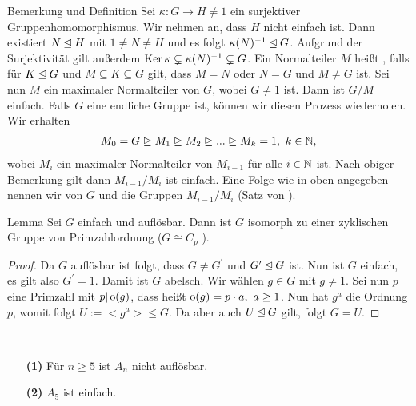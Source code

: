 \begin{genericdf}{Bemerkung und Definition} \label{skript:4.8}    
	Sei $ \kappa : G \to H \neq 1 $ ein surjektiver Gruppenhomomorphismus.
	Wir nehmen an, dass $ H $ nicht einfach ist. Dann existiert $ N \unlhd H $ mit $ 1 \neq N \neq H $ und es folgt
	$ \kappa(N)^{-1} \unlhd G $. Aufgrund der Surjektivität gilt außerdem $ \operatorname{Ker} \kappa \subsetneq \kappa(N)^{-1} \subsetneq G $. 
	Ein Normalteiler $ M $ heißt , falls für $ K \unlhd G $ und $ M \subseteq K \subseteq G $ gilt,
	dass $ M=N   $ oder $ N=G $ und $ M \neq G $ ist.
	Sei nun $ M $ ein maximaler Normalteiler von $ G $, wobei $ G \neq 1 $ ist. Dann ist $ G/M $ einfach.
	Falls $ G $ eine endliche Gruppe ist, können wir diesen Prozess wiederholen. Wir erhalten
	\begin{align*}
	M_0 = G \trianglerighteq M_1 \trianglerighteq M_2 \trianglerighteq ...\trianglerighteq M_k = 1, \ k \in \mathbb{N} ,
	\end{align*} 
	wobei $ M_i $ ein maximaler Normalteiler von $ M_{i-1} $ für alle $ i \in \mathbb{N} $ ist.
	Nach obiger Bemerkung gilt dann $ M_{i-1} / M_i $ ist einfach. Eine Folge wie in oben angegeben nennen wir 
	 von $ G $ und die Gruppen $ M_{i-1} / M_i $ 
	(Satz von ).
\end{genericdf}

\begin{genericdf}{Lemma} \label{skript:4.9}
	Sei $ G $ einfach und auflösbar. Dann ist $ G $ isomorph zu einer zyklischen Gruppe von Primzahlordnung ($ G \cong C_p $ ).
\end{genericdf}

\begin{proof}
	Da $ G $ auflösbar ist folgt, dass $ G \neq G^\prime $ und $ G^\prime \unlhd G $ ist.
	Nun ist $ G $ einfach, es gilt also $ G^\prime = 1 $. Damit ist $ G $ abelsch.
	Wir wählen  $ g\in G $ mit $ g \neq 1 $. 
	Sei nun $ p  $ eine Primzahl mit $ p | \operatorname{o}(g) $, dass heißt $ \operatorname{o}(g) = p \cdot a , \ a \geq 1$.
	Nun hat $ g^a $ die Ordnung $ p $, womit folgt $ U := <g^a> \leq G $. Da aber auch $ U \unlhd G $ gilt, folgt $ G=U $.
\end{proof}

\begin{sz}\label{skript:4.10} \
	\begin{enumerate}
		\item[\textbf{(1)}]
		Für $ n \geq 5 $ ist $ A_n $ nicht auflösbar.
		\item[\textbf{(2)}]
		$ A_5 $ ist einfach.
	\end{enumerate}
\end{sz}

